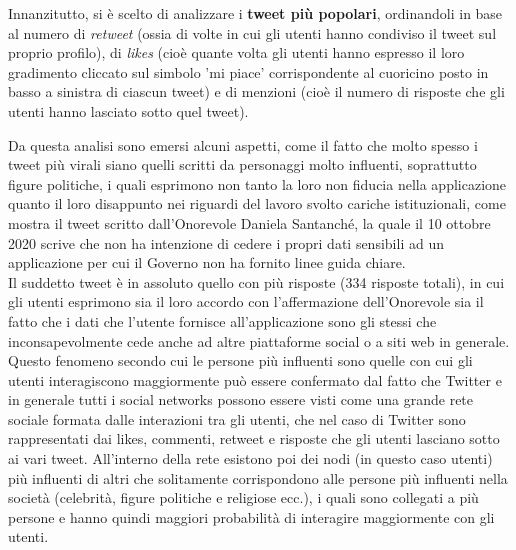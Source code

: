 Innanzitutto, si è scelto di analizzare i \textbf{tweet più popolari}, ordinandoli in base al numero di \textit{retweet} (ossia di volte in cui gli utenti hanno condiviso il tweet sul proprio profilo), di \textit{likes} (cioè quante volta gli utenti hanno espresso il loro gradimento cliccato sul simbolo 'mi piace' corrispondente al cuoricino posto in basso a sinistra di ciascun tweet)  e di menzioni (cioè il numero di risposte che gli utenti hanno lasciato sotto quel tweet).

Da questa analisi sono emersi alcuni aspetti, come il fatto che molto spesso i tweet più virali siano quelli scritti da personaggi molto influenti, soprattutto figure politiche, i quali esprimono non tanto la loro non fiducia nella applicazione quanto il loro disappunto nei riguardi del lavoro svolto cariche istituzionali, come mostra il tweet scritto dall'Onorevole Daniela Santanché, la quale il 10 ottobre 2020 scrive che non ha intenzione di cedere i propri dati sensibili ad un applicazione per cui il Governo non ha fornito linee guida chiare.\\
Il suddetto tweet è in assoluto quello con più risposte (334 risposte totali), in cui gli utenti esprimono sia il loro accordo con l'affermazione dell'Onorevole sia il fatto che i dati che l'utente fornisce all'applicazione sono gli stessi che inconsapevolmente cede anche ad altre piattaforme social o a siti web in generale.\\
Questo fenomeno secondo cui le persone più influenti sono quelle con cui gli utenti interagiscono maggiormente può essere confermato dal fatto che Twitter e in generale tutti i social networks possono essere visti come una grande rete sociale formata dalle interazioni tra gli utenti, che nel caso di Twitter sono rappresentati dai likes, commenti, retweet e risposte che gli utenti lasciano sotto ai vari tweet. All'interno della rete esistono poi dei nodi (in questo caso utenti) più influenti di altri che solitamente corrispondono alle persone più influenti nella società (celebrità, figure politiche e religiose ecc.), i quali sono collegati a più persone e hanno quindi maggiori probabilità di interagire maggiormente con gli utenti.



